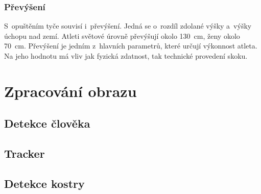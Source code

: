 \subsubsection{Převýšení}

S~opuštěním tyče souvisí i~převýšení. Jedná se o~rozdíl zdolané výšky a~výšky úchopu nad zemí. Atleti světové úrovně převýšují okolo 130~cm, ženy okolo 70~cm. Převýšení je jedním z~hlavních parametrů, které určují výkonnost atleta. Na jeho hodnotu má vliv jak fyzická zdatnost, tak technické provedení skoku.

\section{Zpracování obrazu}

\subsection{Detekce člověka}



\subsection{Tracker}

\subsection{Detekce kostry}









































